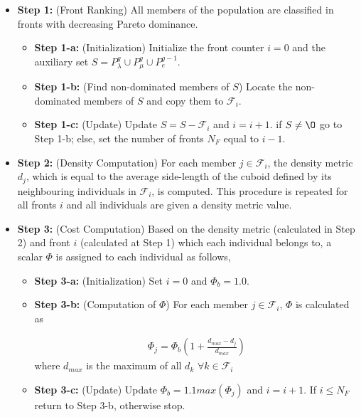 \begin{itemize}
\item[]{\bf Step 1:}  (Front Ranking) All members of the population are classified in fronts with decreasing Pareto dominance.  
\begin{itemize}
\item[]{\bf Step 1-a:}  (Initialization) Initialize the front counter $i=0$ and the auxiliary set $S=P_{\lambda}^g \cup P_{\mu}^g \cup P_{e}^{g-1}$.

\item[]{\bf Step 1-b:}  (Find non-dominated members of $S$) Locate the non-dominated members of $S$ and copy them to $\mathcal{F}_i$. 

\item[]{\bf Step 1-c:}  (Update) Update $S=S-\mathcal{F}_i$ %
and $i=i+1$. if $S\neq\O$ go to Step 1-b; else, set the number of fronts $N_F$ equal to $i-1$.
\end{itemize}
\item[]{\bf Step 2:}  (Density Computation) For each member $j \in \mathcal{F}_i$, the density metric $d_j$, which is equal to the average side-length of the cuboid defined by its neighbouring individuals in $\mathcal{F}_i$, is computed. This procedure is repeated for all fronts $i$ and all individuals are given a density metric value.

\item[]{\bf Step 3:}  (Cost Computation) Based on the density metric (calculated in Step 2) and front $i$ (calculated at Step 1) which each individual belongs to, a scalar $\Phi$ is assigned to each individual as follows,
\begin{itemize}
\item[]{\bf Step 3-a:}  (Initialization) Set $i=0$ and $\Phi_b=1.0$.
\item[]{\bf Step 3-b:}  (Computation of $\Phi$) For each member $j \in \mathcal{F}_i$, $\Phi$ is calculated as

\begin{eqnarray}
	\nonumber
	\Phi_j= \Phi_b(1+\frac{d_{max}-d_j}{d_{max}}) 
\end{eqnarray} 
where $d_{max}$ is the maximum of all $d_k$ $\forall k \in \mathcal{F}_i$   
\item[]{\bf Step 3-c:}  (Update) Update $\Phi_b=1.1max(\Phi_j)$ and $i=i+1$. If $i \leq N_F$ return to Step 3-b, otherwise stop. 
\end{itemize}
\end{itemize}


